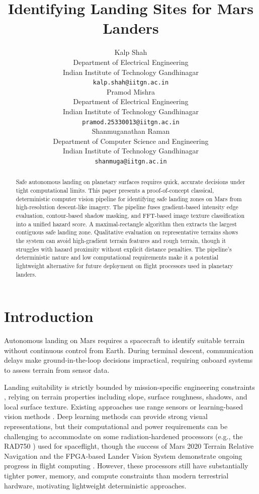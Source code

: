 \documentclass{article}
\title{Identifying Landing Sites for Mars
Landers}
\author{
  Kalp Shah \\
  Department of Electrical Engineering \\
  Indian Institute of Technology Gandhinagar \\
  \texttt{kalp.shah@iitgn.ac.in} \\
   \And
  Pramod Mishra \\
  Department of Electrical Engineering \\
  Indian Institute of Technology Gandhinagar \\
  \texttt{pramod.25330013@iitgn.ac.in} \\
  \And
  Shanmuganathan Raman \\
  Department of Computer Science and Engineering \\
  Indian Institute of Technology Gandhinagar \\
  \texttt{shanmuga@iitgn.ac.in} \\
}
\begin{document}
\maketitle


\begin{abstract}
Safe autonomous landing on planetary surfaces requires quick, accurate decisions under tight computational limits. This paper presents a proof-of-concept classical, deterministic computer vision pipeline for identifying safe landing zones on Mars from high-resolution descent-like imagery. The pipeline fuses gradient-based intensity edge evaluation, contour-based shadow masking, and FFT-based image texture classification into a unified hazard score. A maximal-rectangle algorithm then extracts the largest contiguous safe landing zone. Qualitative evaluation on representative terrains shows the system can avoid high-gradient terrain features and rough terrain, though it struggles with hazard proximity without explicit distance penalties. The pipeline's deterministic nature and low computational requirements make it a potential lightweight alternative for future deployment on flight processors used in planetary landers.
\end{abstract}




\section{Introduction}
Autonomous landing on Mars requires a spacecraft to identify suitable terrain without continuous control from Earth. During terminal descent, communication delays make ground-in-the-loop decisions impractical, requiring onboard systems to assess terrain from sensor data.

Landing suitability is strictly bounded by mission-specific engineering constraints \cite{golombek2012selection}, relying on terrain properties including slope, surface roughness, shadows, and local surface texture. Existing approaches use range sensors \cite{amzajerdian2013alhat} or learning-based vision methods \cite{moghe2020deep}. Deep learning methods can provide strong visual representations, but their computational and power requirements can be challenging to accommodate on some radiation-hardened processors (e.g., the RAD750 \cite{berger2001rad750}) used for spaceflight, though the success of Mars 2020 Terrain Relative Navigation and the FPGA-based Lander Vision System demonstrate ongoing progress in flight computing \cite{johnson2020mars2020}. However, these processors still have substantially tighter power, memory, and compute constraints than modern terrestrial hardware, motivating lightweight deterministic approaches.
\end{document}

